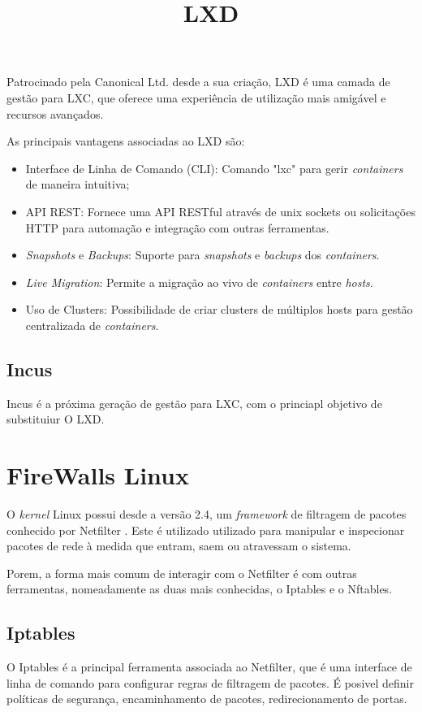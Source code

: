 \title*{\textbf{LXD}}

Patrocinado pela Canonical Ltd. desde a sua  criação, LXD é uma camada de gestão para LXC, 
que oferece uma experiência de utilização mais amigável e recursos avançados.

As principais vantagens associadas ao LXD são:
\begin{itemize}
\item Interface de Linha de Comando (CLI): Comando "lxc" para gerir \textit{containers}
de maneira intuitiva;
\item API REST: Fornece uma API RESTful através de unix sockets ou solicitações HTTP para automação e integração com outras ferramentas.
\item \textit{Snapshots} e \textit{Backups}: Suporte para \textit{snapshots} e \textit{backups} dos \textit{containers}.
\item \textit{Live Migration}: Permite a migração ao vivo de \textit{containers} entre \textit{hosts}.
\item Uso de {Clusters}: Possibilidade de criar clusters de múltiplos hosts para gestão centralizada de \textit{containers}.
\end{itemize}


\subsection{Incus}

Incus é a próxima geração de gestão para LXC, com o princiapl objetivo de substituiur
O LXD.

\section{FireWalls Linux}

O \textit{kernel} Linux possui desde a versão 2.4, um \textit{framework} de filtragem de pacotes 
conhecido por Netfilter \cite{netfilter}. Este é utilizado utilizado para manipular e inspecionar 
pacotes de rede à medida que entram, saem ou atravessam o sistema.

Porem, a forma mais comum de interagir com o Netfilter é com outras ferramentas,
nomeadamente as duas mais conhecidas, o Iptables e o Nftables.

\subsection{Iptables}

O Iptables é a principal ferramenta associada ao Netfilter, que é uma interface
de linha de comando para configurar regras de filtragem de pacotes.
É posivel definir políticas de segurança, encaminhamento de pacotes,
redirecionamento de portas. 

